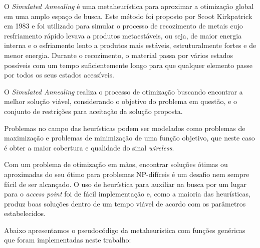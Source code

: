\documentclass[
	12pt,				%
	openright,			%
	twoside,			%
	a4paper,			%
	english,			%
	french,				%
	spanish,			%
	brazil				%
	]{abntex2}
\begin{document}
O \textit{Simulated Annealing} é uma metaheurística para aproximar a otimização global em uma amplo espaço de busca. Este método foi proposto por Scoot Kirkpatrick em 1983 e foi utilizado para simular o processo de recozimento de metais cujo resfriamento  rápido levava a produtos metaestáveis, ou seja, de maior energia interna e o esfriamento lento a produtos mais estáveis, estruturalmente fortes e de menor energia. Durante o recozimento, o material passa por vários estados possíveis com um tempo suficientemente longo para que qualquer elemento passe por todos os seus estados acessíveis.

O \textit{Simulated Annealing} realiza o processo de otimização buscando encontrar a melhor solução viável, considerando o objetivo do problema em questão, e o conjunto de restrições para aceitação da solução proposta.

Problemas no campo das heurísticas podem ser modelados como problemas de maximização e problemas de minimização de uma função objetivo, que neste caso é obter a maior cobertura e qualidade do sinal \textit{wireless}.

Com um problema de otimização em mãos, encontrar soluções ótimas ou aproximadas do seu ótimo para problemas NP-difíceis é um desafio nem sempre fácil de ser alcançado. O uso de heurística para auxiliar na busca por um lugar para o \textit{access point} foi de fácil implementação e, como a maioria das heurísticas, produz boas soluções dentro de um tempo viável de acordo com os parâmetros estabelecidos.

Abaixo apresentamos o pseudocódigo da metaheurística com funções genéricas que foram implementadas neste trabalho:
\end{document}
